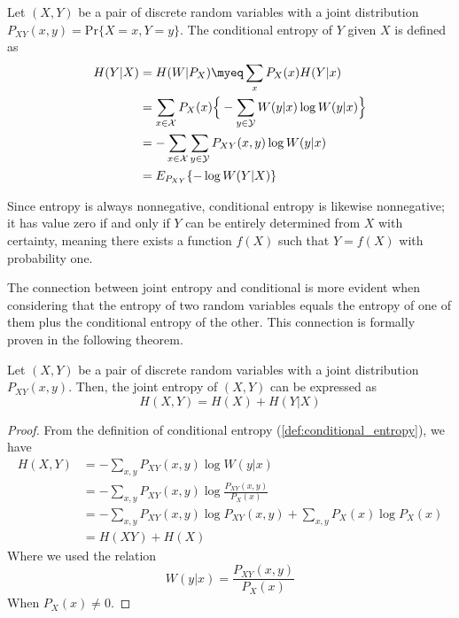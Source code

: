 \begin{definition}\label{def:conditional_entropy}
    Let $(X,Y)$ be a pair of discrete random variables with a joint distribution $P_{XY}(x,y) = \text{Pr}\{X=x,Y=y\}$. The conditional entropy of $Y$ given $X$ is defined as
    \begin{align}
        H(Y|X) & = H(W | P_X) \myeq \sum_x P_X(x)H(Y|x)                                                       \\
               & = \sum_{x \in \mathcal{X}} P_X(x) \Big\{ -\sum_{y \in \mathcal{Y}} W(y|x) \log W(y|x) \Big\} \\
               & = -\sum_{x\in\mathcal{X}}\sum_{y\in\mathcal{Y}} P_{XY}(x,y)\log W(y|x)                       \\
               & = E_{P_{XY}} \{ -\log W(Y|X) \}
    \end{align}
\end{definition}

\noindent Since entropy is always nonnegative, conditional entropy is likewise nonnegative; it has value zero if and only if $Y$ can be entirely determined from $X$ with certainty, meaning there exists a function $f(X)$ such that $Y = f(X)$ with probability one. \vspace*{0.4cm}

\noindent The connection between joint entropy and conditional is more evident when considering that the entropy of two random variables equals the entropy of one of them plus the conditional entropy of the other. This connection is formally proven in the following theorem.

\begin{theorem}\label{thm:chain_rule}
    Let $(X,Y)$ be a pair of discrete random variables with a joint distribution $P_{XY}(x,y)$. Then, the joint entropy of $(X,Y)$ can be expressed as
    \begin{equation}
        H(X,Y) = H(X) + H(Y|X)
    \end{equation}
\end{theorem}
\begin{proof}
    From the definition of conditional entropy (\ref{def:conditional_entropy}), we have
    \begin{align*}
        H(X,Y) & = -\sum_{x,y} P_{XY}(x,y) \log W(y|x)                                        \\
               & = -\sum_{x,y} P_{XY}(x,y) \log \frac{P_{XY}(x,y)}{P_X(x)}                    \\
               & = -\sum_{x,y} P_{XY}(x,y) \log P_{XY}(x,y) + \sum_{x,y} P_{X}(x) \log P_X(x) \\
               & = H(XY) + H(X)
    \end{align*}
    Where we used the relation
    \begin{equation}
        W(y|x) = \frac{P_{XY}(x,y)}{P_X(x)}
    \end{equation}
    When $P_X(x) \neq 0$.
\end{proof}

